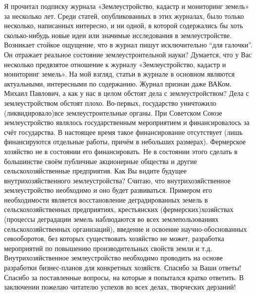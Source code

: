 \begin{drama}
	\maxspeaks Я прочитал подписку журнала «Землеустройство, кадастр и мониторинг земель» за несколько лет. Среди статей, опубликованных в этих журналах, было только несколько, написанных интересно, и ни одной, в которой содержались бы хоть сколько-нибудь новые идеи или значимые исследования в землеустройстве. Возникает стойкое ощущение, что в журнал пишут исключительно “для галочки”. Он отражает реальное состояние землеустроительной науки?
	\michaelspeaks Думается, что у Вас несколько предвзятое отношение к журналу «Землеустройство, кадастр и мониторинг земель». На мой взгляд, статьи в журнале в основном являются актуальными, интересными по содержанию. Журнал признан даже ВАКом. 
	\maxspeaks Михаил Павлович, а как у нас в целом обстоят дела с землеустройством?
	\michaelspeaks Дела с землеустройством обстоят плохо. Во-первых, государство уничтожило (ликвидировало)все землеустроительные органы. При Советском Союзе землеустройство являлось государственным мероприятием и финансировалось за счёт государства. В настоящее время такое финансирование отсутствует (лишь финансируются отдельные работы, причём в небольших размерах). Фермерское хозяйство не в состоянии его финансировать. Не в состоянии этого сделать в большинстве своём публичные акционерные общества и другие сельскохозяйственные предприятия.
	\maxspeaks Как Вы видите будущее внутрихозяйственного землеустройства?
	\michaelspeaks Считаю, что внутрихозяйственное землеустройство необходимо и оно будет развиваться. Примером его необходимости является восстановление деградированных земель в сельскохозяйственных предприятиях, крестьянских (фермерских)хозяйствах (процессы деградации земель наблюдаются во всех землепользованиях сельскохозяйственных организаций), введение и освоение научно-обоснованных севооборотов, без которых существовать хозяйство не может, разработка мероприятий по повышению производительных свойств земли и т.д. Внутрихозяйственное землеустройство необходимо проводить на основе разработки бизнес-планов для конкретных хозяйств.
	\maxspeaks Спасибо за Ваши ответы!
	\michaelspeaks Спасибо за поставленные вопросы, на которые я попытался кратко ответить. В заключении пожелаю читателю успехов во всех делах, творческих дерзаний!


\end{drama}